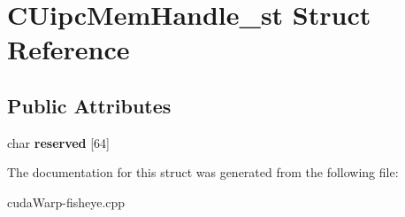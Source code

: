 \hypertarget{structCUipcMemHandle__st}{}\section{C\+Uipc\+Mem\+Handle\+\_\+st Struct Reference}
\label{structCUipcMemHandle__st}
\subsection*{Public Attributes}
\begin{DoxyCompactItemize}
\item 
char {\bfseries reserved} \mbox{[}64\mbox{]}\hypertarget{structCUipcMemHandle__st_a75d75ecfaad3090e2574f2ef6ee6c21a}{}\label{structCUipcMemHandle__st_a75d75ecfaad3090e2574f2ef6ee6c21a}

\end{DoxyCompactItemize}


The documentation for this struct was generated from the following file\+:\begin{DoxyCompactItemize}
\item 
cuda\+Warp-\/fisheye.\+cpp\end{DoxyCompactItemize}
